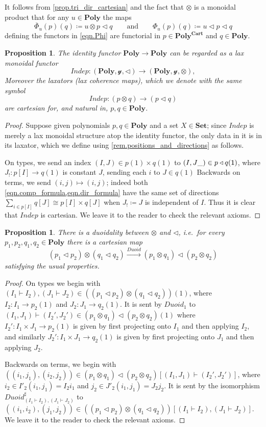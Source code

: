 \documentclass[11pt, one side, article]{memoir}
\theoremstyle{definition}
\theoremstyle{plain}
\newtheorem{proposition}[definitionx]{Proposition}
\newcommand{\Cat}[1]{\mathbf{#1}}%
\newcommand{\Fun}[1]{\mathit{#1}}%
\newcommand{\To}[2][]{\xrightarrow[#1]{#2}}
\newcommand{\ol}[1]{\overline{#1}}
\newcommand{\smset}{\Cat{Set}}
\newcommand{\yon}{\mathcal{y}}
\newcommand{\poly}{\Cat{Poly}}
\newcommand{\polycart}{\poly^{\Cat{Cart}}}
\newcommand{\0}{\textsf{0}}
\newcommand{\1}{\tn{\textsf{1}}}
\newcommand{\tri}{\mathbin{\triangleleft}}
\newcommand{\indep}{\Fun{Indep}}
\newcommand{\duoid}{\Fun{Duoid}}
\newcommand{\qqand}{\qquad\text{and}\qquad}
\begin{document}
It follows from \cref{prop.tri_dir_cartesian} and the fact that $\otimes$ is a monoidal product that for any $u\in\poly$ the maps
\[
	\ol{\Phi}_u(p)(q)\coloneqq u\otimes p\tri q
	\qqand
	\Phi_u(p)(q)\coloneqq u\tri p\tri q
\]
defining the functors in \eqref{eqn.Phi} are functorial in $p\in\polycart$ and $q\in\poly$.

\begin{proposition}\label{prop.indep}
The identity functor $\poly\to\poly$ can be regarded as a lax monoidal functor
\begin{equation}\label{eqn.indep}
	\indep\colon (\poly,\yon,\tri)\to(\poly,\yon,\otimes),
\end{equation}
Moreover the laxators (lax coherence maps), which we denote with the same symbol
\[\indep\colon (p\otimes q)\to (p\tri q)\]
are cartesian for, and natural in, $p,q\in\poly$.
\end{proposition}
\begin{proof}
Suppose given polynomials $p,q\in\poly$ and a set $X\in\smset$; since $\indep$ is merely a lax monoidal structure atop the identity functor, the only data in it is in its laxator, which we define using \cref{rem.positions_and_directions} as follows.

On types, we send an index $(I,J)\in p(1)\times q(1)$ to $(I,J\_)\in p\tri q(\1)$, where $J_!\colon p[I]\to q(1)$ is constant $J$, sending each $i$ to $J\in q(1)$ Backwards on terms, we send $(i,j)\mapsto (i,j)$; indeed both \cref{eqn.comp_formula,eqn.dir_formula} have the same set of directions $\sum_{i\in p[I]}q[J]\cong p[I]\times q[J]$ when $J_!\coloneqq J$ is independent of $I$. Thus it is clear that $\indep$ is cartesian. We leave it to the reader to check the relevant axioms.
\end{proof}

\begin{proposition}\label{prop.duoidal}
There is a duoidality between $\otimes$ and $\tri$, i.e.\ for every $p_1,p_2,q_1,q_2\in\poly$ there is a cartesian map
\[
	(p_1\tri p_2)\otimes(q_1\tri q_2)\To{\duoid} (p_1\otimes q_1)\tri (p_2\otimes q_2)
\]
satisfying the usual properties.
\end{proposition}
\begin{proof}
On types we begin with $(I_1\vdash I_2),(J_1\vdash J_2)\in ((p_1\tri p_2)\otimes(q_1\tri q_2))(1)$, where $I_2\colon I_1\to p_2(1)$ and $J_2\colon J_1\to q_2(1)$. It is sent by $\duoid_1$ to $(I_1,J_1)\vdash(I_2',J_2')\in (p_1\otimes q_1)\tri (p_2\otimes q_2)(1)$ where $I_2'\colon I_1\times J_1\to p_2(1)$ is given by first projecting onto $I_1$ and then applying $I_2$, and similarly $J_2'\colon I_1\times J_1\to q_2(1)$ is given by first projecting onto $J_1$ and then applying $J_2$. 

Backwards on terms, we begin with $((i_1,j_1),(i_2,j_2))\in (p_1\otimes q_1)\tri (p_2\otimes q_2)[(I_1,J_1)\vdash(I_2',J_2')]$, where $i_2\in I'_2(i_1,j_1)=I_2 i_1$ and $j_2\in J'_2(i_1,j_1)=J_2 j_2$. It is sent by the isomorphism $\duoid^\sharp_{(I_1\vdash I_2),(J_1\vdash J_2)}$ to $((i_1,i_2),(j_1,j_2))\in ((p_1\tri p_2)\otimes(q_1\tri q_2))[(I_1\vdash I_2),(J_1\vdash J_2)]$. We leave it to the reader to check the relevant axioms.
\end{proof}
\end{document}
